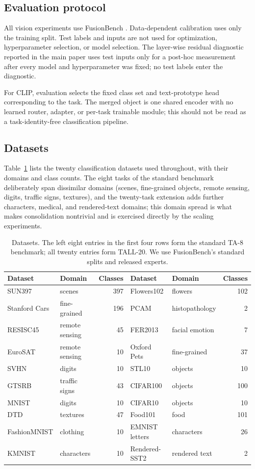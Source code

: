 \documentclass[letterpaper]{article} %
\theoremstyle{plain}
\theoremstyle{definition}
\begin{document}
\subsection{Evaluation protocol}
All vision experiments use FusionBench \citep{tang2024fusionbench}.
Data-dependent calibration uses only the training split.
Test labels and inputs are not used for optimization, hyperparameter selection, or model selection.
The layer-wise residual diagnostic reported in the main paper uses test inputs only for a post-hoc measurement after every model and hyperparameter was fixed; no test labels enter the diagnostic.

For CLIP, evaluation selects the fixed class set and text-prototype head corresponding to the task.
The merged object is one shared encoder with no learned router, adapter, or per-task trainable module; this should not be read as a task-identity-free classification pipeline.

\subsection{Datasets}
Table~\ref{tab:datasets} lists the twenty classification datasets used throughout, with their domains and class counts.
The eight tasks of the standard benchmark deliberately span dissimilar domains (scenes, fine-grained objects, remote sensing, digits, traffic signs, textures), and the twenty-task extension adds further characters, medical, and rendered-text domains; this domain spread is what makes consolidation nontrivial and is exercised directly by the scaling experiments.

\begin{table}[tb]
\centering
{\small
\begin{tabular*}{\textwidth}{@{\extracolsep{\fill}}llrllr}
\toprule
Dataset & Domain & Classes & Dataset & Domain & Classes \\
\midrule
SUN397 & scenes & 397 & Flowers102 & flowers & 102 \\
Stanford Cars & fine-grained & 196 & PCAM & histopathology & 2 \\
RESISC45 & remote sensing & 45 & FER2013 & facial emotion & 7 \\
EuroSAT & remote sensing & 10 & Oxford Pets & fine-grained & 37 \\
SVHN & digits & 10 & STL10 & objects & 10 \\
GTSRB & traffic signs & 43 & CIFAR100 & objects & 100 \\
MNIST & digits & 10 & CIFAR10 & objects & 10 \\
DTD & textures & 47 & Food101 & food & 101 \\
FashionMNIST & clothing & 10 & EMNIST letters & characters & 26 \\
KMNIST & characters & 10 & Rendered-SST2 & rendered text & 2 \\
\bottomrule
\end{tabular*}
}
\caption{Datasets. The left eight entries in the first four rows form the standard
TA-8 benchmark; all twenty entries form TALL-20.
We use FusionBench's standard splits and released experts.}
\label{tab:datasets}
\end{table}
\end{document}
